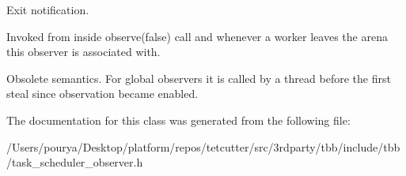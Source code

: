 Exit notification. 

Invoked from inside observe(false) call and whenever a worker leaves the arena this observer is associated with.

Obsolete semantics. For global observers it is called by a thread before the first steal since observation became enabled. 

The documentation for this class was generated from the following file\+:\begin{DoxyCompactItemize}
\item 
/\+Users/pourya/\+Desktop/platform/repos/tetcutter/src/3rdparty/tbb/include/tbb/task\+\_\+scheduler\+\_\+observer.\+h\end{DoxyCompactItemize}
